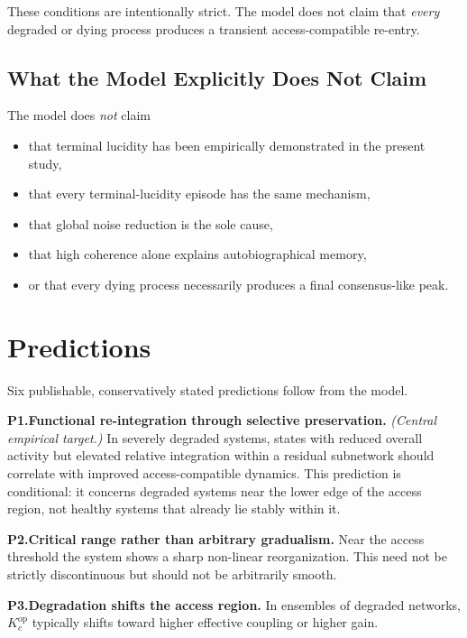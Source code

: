 ﻿\documentclass[11pt,a4paper]{article}
\theoremstyle{plain}
\theoremstyle{definition}
\theoremstyle{remark}
\newcommand{\Kcop}{K_c^{\mathrm{op}}}
\begin{document}
These conditions are intentionally strict. The model does not claim that \emph{every} degraded or dying process produces a transient access-compatible re-entry.

\subsection{What the Model Explicitly Does Not Claim}

The model does \emph{not} claim
\begin{itemize}
\item that terminal lucidity has been empirically demonstrated in the present study,
\item that every terminal-lucidity episode has the same mechanism,
\item that global noise reduction is the sole cause,
\item that high coherence alone explains autobiographical memory,
\item or that every dying process necessarily produces a final consensus-like peak.
\end{itemize}


\section{Predictions}
\label{sec:predictions}
\label{sec:vorhersagen}

Six publishable, conservatively stated predictions follow from the model.

\medskip
\noindent\textbf{P1.\;Functional re-integration through selective preservation.} \emph{(Central empirical target.)}\quad
In severely degraded systems, states with reduced overall activity but elevated relative integration within a residual subnetwork should correlate with improved access-compatible dynamics. This prediction is conditional: it concerns degraded systems near the lower edge of the access region, not healthy systems that already lie stably within it.

\medskip
\noindent\textbf{P2.\;Critical range rather than arbitrary gradualism.}\quad
Near the access threshold the system shows a sharp non-linear reorganization. This need not be strictly discontinuous but should not be arbitrarily smooth.

\medskip
\noindent\textbf{P3.\;Degradation shifts the access region.}\quad
In ensembles of degraded networks, $\Kcop$ typically shifts toward higher effective coupling or higher gain.
\end{document}
